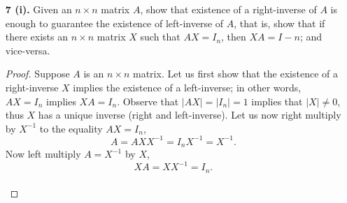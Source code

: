 \documentclass[ 12pt ]{article}
\begin{document}
\begin{enumerate}
		\begin{proof}
			\begin{enumerate}
				\item[\textbf{(i)}] Let us first row reduce $A$ using only row replacement operations.
					\begin{align*}
						\begin{bmatrix} 3 & 4 & 5 \\ 4 & 3 & 7 \\ 5 & 7 & 5 \end{bmatrix} \sim \begin{bmatrix} -1 & 1 & -2 \\ 4 & 3 & 7 \\ 5 & 7 & 5 \end{bmatrix} \sim
						\begin{bmatrix} -1 & 1 & -2 \\ 0 & 7 & -1 \\ 0 & 12 & -5 \end{bmatrix} \sim \begin{bmatrix} -1 & 1 & -2 \\ 0 & -5 & 4 \\ 0 & 12 & -5 \end{bmatrix} \sim
						\begin{bmatrix} -1 & 1 & -2 \\ 0 & -5 & 4 \\ 0 & 0 & \frac{23}{5} \end{bmatrix}.
					\end{align*}
					Since our matrix is in row echelon form, our determinant is the product of the diagonal, illustrating that 23 divides $|A|$ since $\frac{23}{5}$ is a diagonal
					member.
				\item[\textbf{(ii)}] Observe that the matrix $A$ is skew-symmetric; in other words, $-A = A^T$. Let us now take the determinant of the equality,
					$-|A| = (-1)^3|A| = |-A| = |A^T| = |A|$. Now we can see that $2|A| = 0$ illustrating that $|A| = 0$.
			\end{enumerate}
		\end{proof}
		\newpage


	\item[\textbf{7 (i).}] Given an $n \times n$ matrix $A$, show that existence of a right-inverse of $A$ is enough to guarantee the existence of left-inverse of $A$, that is, show that if there exists an $n \times n$
		matrix $X$ such that $AX = I_n$, then $XA = I-n$; and vice-versa.

	\begin{proof}
		Suppose $A$ is an $n \times n$ matrix. Let us first show that the existence of a right-inverse $X$ implies the existence of a left-inverse; in other words, $AX = I_n$
		implies $XA = I_n$. Observe that $|AX| = |I_n| = 1$ implies that $|X| \neq 0$, thus $X$ has a unique inverse (right and left-inverse). Let us now right multiply by
		$X^{-1}$ to the equality $AX = I_n$, $$A = AXX^{-1} = I_nX^{-1} = X^{-1}.$$ Now left multiply $A = X^{-1}$ by $X$, $$XA = XX^{-1} = I_n.$$ \\


\end{proof}
\end{enumerate}
\end{document}
